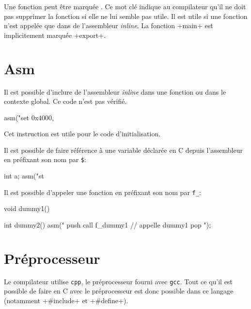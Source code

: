 \documentclass[a4paper]{article}
\begin{document}
    Une fonction peut être marquée . Ce mot clé indique au
    compilateur qu'il ne doit pas supprimer la fonction si elle ne lui semble
    pas utile. Il est utile si une fonction n'est appelée que dans de
    l'assembleur \emph{inline}. La fonction \imoc+main+ est implicitement
    marquée \imoc+export+.

  \section{Asm}
    Il est possible d'inclure de l'assembleur \emph{inline} dans une fonction ou
    dans le contexte global. Ce code n'est pas vérifié.

    \begin{moc}
asm("set 0x4000, %
    \end{moc}

    Cet instruction est utile pour le code d'initialisation.

    Il est possible de faire référence à une variable déclarée en C depuis
    l'assembleur en préfixant son nom par \verb+$+:
    \begin{moc}
int a;
asm("st %
    \end{moc}

    Il est possible d'appeler une fonction en préfixant son nom par \verb+f_+:
    \begin{moc}
void dummy1() {
}

int dummy2() {
    asm("
        push %
        call f_dummy1 // appelle dummy1
        pop %
    ");
}
    \end{moc}

  \section{Préprocesseur}
    Le compilateur utilise \verb+cpp+, le préprocesseur fourni avec \verb+gcc+.
    Tout ce qu'il est possible de faire en C avec le préprocesseur est donc
    possible dans ce langage (notamment \imoc+#include+ et \imoc+#define+).
\end{document}
